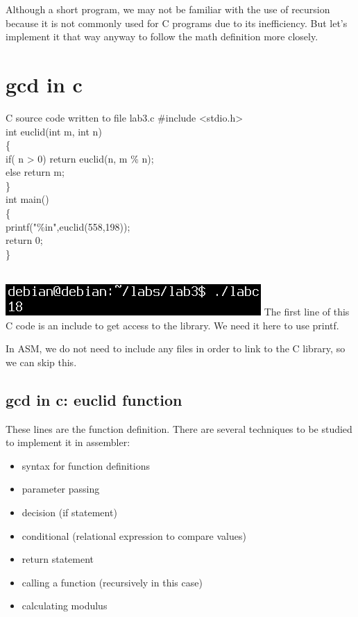 \documentclass{article}
\begin{document}
Although a short program, we may not be familiar with the use of recursion because it is not commonly used for C programs due to its inefficiency. But let's implement it that way anyway to follow the math definition more closely.
\clearpage\section{gcd in c}
\begin{GFT}{C source code written to file lab3.c}
\+\#include <stdio.h>\\
\+int euclid(int m, int n)\\
\+\{\\
\+  if( n > 0) return euclid(n, m \% n);\\
\+  else return m;\\
\+\}\\
\+int main()\\
\+\{\\
\+  printf("\%i\Backslash{}n",euclid(558,198));\\
\+  return 0;\\
\+\}\\
\+\\
\end{GFT}
\includegraphics[scale=0.5]{fig2.png}
\clearpage
The first line of this C code is an include to get access to the library. We need it here to use printf.

In ASM, we do not need to include any files in order to link to the C library, so we can skip this.
\clearpage\subsection{gcd in c: euclid function}

These lines are the function definition. There are several techniques to be studied to implement it in assembler:
\begin{itemize}
\item syntax for function definitions
\item parameter passing
\item decision (if statement)
\item conditional (relational expression to compare values)
\item return statement
\item calling a function (recursively in this case)
\item calculating modulus
\end{itemize}
\end{document}
